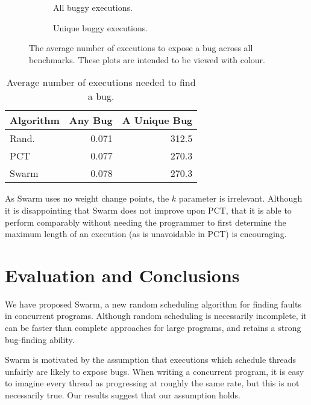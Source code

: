 \begin{figure}
  \centering
  \begin{subfigure}{0.49\textwidth}
    \centering
    \resizebox{\textwidth}{!}{}
    \caption{All buggy executions.}\label{fig:freqbugs-total}
  \end{subfigure}
  \begin{subfigure}{0.49\textwidth}
    \centering
    \resizebox{\textwidth}{!}{}
    \caption{Unique buggy executions.}\label{fig:freqbugs-unique}
  \end{subfigure}
  \caption[Plot of average number of executions needed to expose a bug.]{The average number of executions to expose a bug across all benchmarks.  These plots are intended to be viewed with colour.}\label{fig:freqbugs}
\end{figure}

\begin{table}
  \centering
  \begin{tabular}{lrr} \toprule
    Algorithm & Any Bug & A Unique Bug \\ \midrule
    Rand. & 0.071 & 312.5 \\
    PCT   & 0.077 & 270.3 \\
    Swarm & 0.078 & 270.3 \\ \bottomrule
  \end{tabular}
  \caption{Average number of executions needed to find a bug.}\label{tbl:freqs}
\end{table}

As Swarm uses no weight change points, the $k$ parameter is
irrelevant.  Although it is disappointing that Swarm does not improve
upon PCT, that it is able to perform comparably without needing the
programmer to first determine the maximum length of an execution (as
is unavoidable in PCT) is encouraging.

\section{Evaluation and Conclusions}
\label{sec:algorithms-conclusion}

We have proposed Swarm, a new random scheduling algorithm for finding
faults in concurrent programs.  Although random scheduling is
necessarily incomplete, it can be faster than complete approaches for
large programs, and retains a strong bug-finding ability.

Swarm is motivated by the assumption that executions which schedule
threads unfairly are likely to expose bugs.  When writing a concurrent
program, it is easy to imagine every thread as progressing at roughly
the same rate, but this is not necessarily true.  Our results suggest
that our assumption holds.

